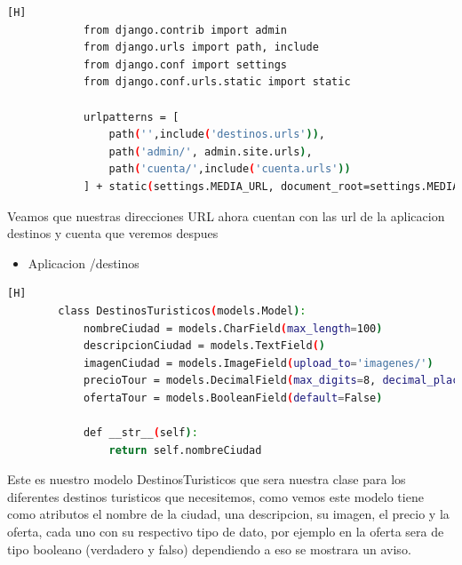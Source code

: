 \documentclass{article}
\begin{document}
        \begin{lstlisting}[language=bash,caption={urls.py del proyecto}][H]
            from django.contrib import admin
            from django.urls import path, include
            from django.conf import settings
            from django.conf.urls.static import static
            
            urlpatterns = [
                path('',include('destinos.urls')),
                path('admin/', admin.site.urls),
                path('cuenta/',include('cuenta.urls'))
            ] + static(settings.MEDIA_URL, document_root=settings.MEDIA_ROOT)
	\end{lstlisting}
        Veamos que nuestras direcciones URL ahora cuentan con las url de la aplicacion destinos y cuenta que veremos despues
        \begin{itemize}
            \item Aplicacion /destinos
        \end{itemize}
        \begin{lstlisting}[language=bash,caption={models.py}][H]
        class DestinosTuristicos(models.Model):
            nombreCiudad = models.CharField(max_length=100)
            descripcionCiudad = models.TextField()
            imagenCiudad = models.ImageField(upload_to='imagenes/')
            precioTour = models.DecimalField(max_digits=8, decimal_places=2)
            ofertaTour = models.BooleanField(default=False)
        
            def __str__(self):
                return self.nombreCiudad
	\end{lstlisting}
    Este es nuestro modelo DestinosTuristicos que sera nuestra clase para los diferentes destinos turisticos que necesitemos, como vemos este modelo tiene como atributos el nombre de la ciudad, una descripcion, su imagen, el precio y la oferta, cada uno con su respectivo tipo de dato, por ejemplo en la oferta sera de tipo booleano (verdadero y falso) dependiendo a eso se mostrara un aviso.
    
\end{document}
